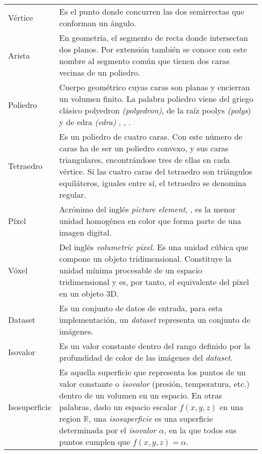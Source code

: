 \begin{table}[h!t]
	\begin{tabular}{lp{11cm}}
	Vértice   & Es el punto donde concurren las dos semirrectas que conforman un ángulo.\\

	Arista    & En geometría, el segmento de recta donde intersectan dos planos. Por extensión también se conoce con este
			nombre al segmento común que tienen dos caras vecinas de un poliedro.\\

	Poliedro  & Cuerpo geométrico cuyas caras son planas y encierran un volumen finito. La palabra poliedro
			viene del griego clásico \textgreek{polyedron} \emph{(polyedron)}, de la raíz \textgreek{poolys} \emph{(polys})
			\jcq{muchas} y de \textgreek{edra} \emph{(edra)} \jcq{base}, \jcq{asiento}, \jcq{cara}.\\

	Tetraedro & Es un poliedro de cuatro caras. Con este número de caras ha de ser un
			poliedro convexo, y sus caras triangulares, encontrándose tres de ellas en cada vértice. Si las
			cuatro caras del tetraedro son triángulos equiláteros, iguales entre sí, el tetraedro se denomina
			regular.\\

	Píxel     & Acrónimo del inglés \emph{picture element}, \jcq{elemento de imagen}, es la menor unidad homogénea en color
			que forma parte de una imagen digital.\\

	Vóxel     & Del inglés \emph{volumetric pixel}. Es una unidad cúbica que compone un objeto
			tridimensional. Constituye la unidad mínima procesable de un espacio tridimensional y es, por
			tanto, el equivalente del píxel en un objeto 3D.\\

	Dataset   & Es un conjunto de datos de entrada, para esta
			implementación, un \emph{dataset} representa un conjunto de imágenes.\\

	Isovalor	& Es un valor constante dentro del rango definido por la profundidad de 					color de las imágenes del \emph{dataset}.\\

	Isosuperficie	& Es aquella superficie que representa los puntos de un valor constante o \emph{isovalor} (presión, temperatura, etc.) dentro de un volumen en un espacio. En otras palabras, dado un espacio escalar $f(x,y,z)$ en una region $\mathbb{R}$, una \emph{isosuperficie} es una superficie determinada por el \emph{isovalor} $\alpha$, en la que todos sus puntos cumplen que $f(x,y,z) = \alpha$.\\


	\end{tabular}
\end{table}
